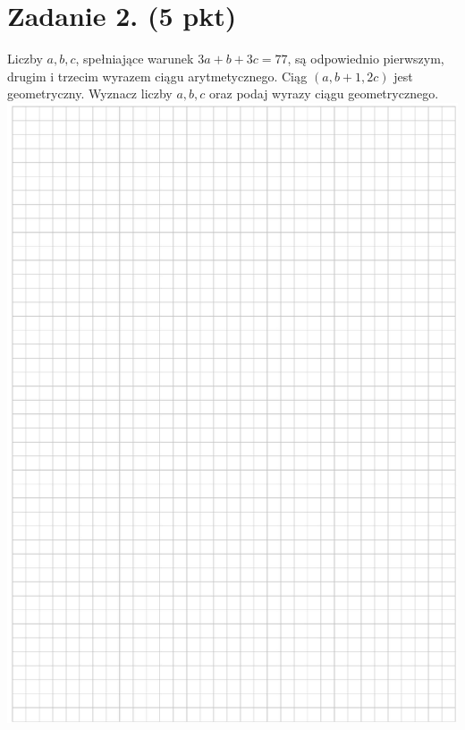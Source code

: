\documentclass[10pt]{article}
\begin{document}
\section*{Zadanie 2. (5 pkt)}
Liczby \(a, b, c\), spełniające warunek \(3 a+b+3 c=77\), są odpowiednio pierwszym, drugim i trzecim wyrazem ciągu arytmetycznego. Ciąg \((a, b+1,2 c)\) jest geometryczny. Wyznacz liczby \(a, b, c\) oraz podaj wyrazy ciągu geometrycznego.\\
\includegraphics[max width=\textwidth, center]{2024_11_21_7379bf55d75dd0fc4c58g-04}\\
\end{document}

